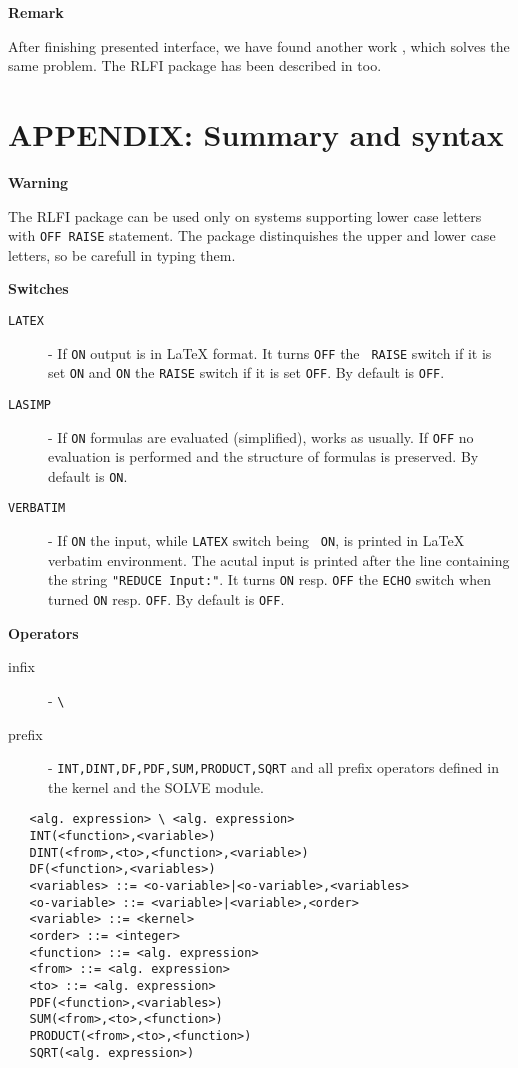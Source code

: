 \centerline{\bf Remark}

After finishing presented interface, we have found another work
\cite{Antweiler:89}, which solves the same problem. The RLFI package has
been described in \cite{Drska:90} too.






\vskip0.5cm

\section{APPENDIX: Summary and syntax}

{\bf Warning}

The RLFI package can be used only on systems supporting lower case
letters with {\tt OFF RAISE} statement. The package distinquishes the
upper and lower case letters, so be carefull in typing them.

{\bf Switches}

\begin{description}
\item[{\tt LATEX}]
- If {\tt ON} output is in \LaTeX{} format. It turns {\tt OFF} the {\tt
RAISE} switch if it is set {\tt ON} and {\tt ON} the {\tt RAISE} switch
if it is set {\tt OFF}. By default is {\tt OFF}.
\item[{\tt LASIMP}]
- If {\tt ON} formulas are evaluated (simplified), \REDUCE{} works
as usually. If {\tt OFF} no evaluation is performed and the structure
of formulas is preserved. By default is {\tt ON}.
\item[{\tt VERBATIM}]
- If {\tt ON} the \REDUCE{} input, while {\tt LATEX} switch being {\tt
ON}, is printed in \LaTeX{} verbatim environment. The acutal \REDUCE{}
input is printed after the line containing the string {\tt "REDUCE
Input:"}.  It turns {\tt ON} resp. {\tt OFF} the {\tt ECHO} switch when
turned {\tt ON} resp. {\tt OFF}. By default is {\tt OFF}.
\end{description}

{\bf Operators}

\begin{description}
\item[infix] - \verb+\+
\item[prefix] - {\tt INT,DINT,DF,PDF,SUM,PRODUCT,SQRT} and all \REDUCE{}
prefix operators defined in the \REDUCE{} kernel and the SOLVE module.
\end{description}

\begin{verbatim}
   <alg. expression> \ <alg. expression>
   INT(<function>,<variable>)
   DINT(<from>,<to>,<function>,<variable>)
   DF(<function>,<variables>)
   <variables> ::= <o-variable>|<o-variable>,<variables>
   <o-variable> ::= <variable>|<variable>,<order>
   <variable> ::= <kernel>
   <order> ::= <integer>
   <function> ::= <alg. expression>
   <from> ::= <alg. expression>
   <to> ::= <alg. expression>
   PDF(<function>,<variables>)
   SUM(<from>,<to>,<function>)
   PRODUCT(<from>,<to>,<function>)
   SQRT(<alg. expression>)
\end{verbatim}

